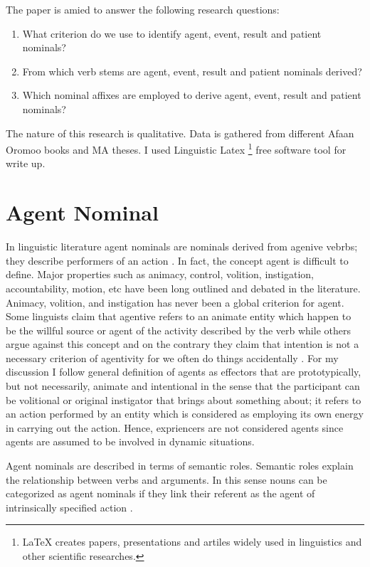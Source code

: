 \documentclass[11pt,a4paper]{article}
\begin{document}
The paper is amied to answer the following research questions:\\
\begin{enumerate}
	\item What criterion do we use to identify agent, event, result and patient nominals? 
	\item From which verb stems are agent, event, result and patient nominals derived?
	\item Which nominal affixes are employed to derive agent, event, result and patient nominals?
\end{enumerate}

The nature of this research is qualitative. Data is gathered from different Afaan Oromoo books and MA theses. I used Linguistic Latex \footnote{LaTeX creates papers, presentations and artiles widely used in linguistics and other scientific researches.} free software tool for write up. 

\section{Agent Nominal}

In linguistic literature agent nominals are nominals derived from agenive vebrbs; they describe performers of an action \cite{huyghe2020s}. In fact, the concept agent is difficult to define. Major properties  such as animacy, control, volition, instigation, accountability, motion, etc have been long outlined and debated in the literature. Animacy, volition, and instigation has never been a global criterion for agent. Some linguists claim that agentive refers to an animate entity which happen to be the willful source or agent of the activity described by the verb \cite{cruse1973some} while others argue against this concept and on the contrary they claim that intention is not a necessary criterion of agentivity for we often do things accidentally \cite{schlesinger1989instruments,caspar2015relationship}. For my discussion I follow \cite[p-188]{huyghe2020s} general definition of agents as effectors that are prototypically, but not necessarily, animate and intentional in the sense that the participant can be volitional or original instigator that brings about something about; it refers to an action performed by an entity which is considered as employing its own energy in carrying out the action. Hence, expriencers are not considered  agents since agents are assumed to be involved in dynamic situations. 


Agent nominals are described in terms of  semantic roles. Semantic roles explain the relationship between verbs and arguments. In this sense nouns can be categorized as agent nominals if they link their referent as the agent of intrinsically specified action \cite[p-189]{huyghe2020s}. 
\end{document}
